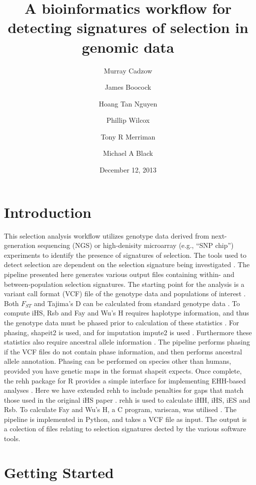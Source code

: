 \documentclass[a4paper,10pt]{article}
\title{\textbf{A bioinformatics workflow for detecting signatures of selection in genomic data}}
\date{December 12, 2013}
\author[1]{Murray Cadzow}
\author[1]{James Boocock}
\author[1,2]{Hoang Tan Nguyen}
\author[1,3]{Phillip Wilcox}
\author[1]{Tony R Merriman}
\author[1]{Michael A Black}
\affil[1]{Department of Biochemistry, University of Otago}
\affil[2]{Department of Mathematics and Statistics, University of Otago}
\affil[3]{Scion Research, Rotorua, New Zealand}
\begin{document}
\maketitle{}\textmd{}
\tableofcontents

\pagebreak
\section{Introduction}

This selection analysis workflow utilizes genotype data derived from
next-generation sequencing (NGS) or high-denisity microarray (e.g.,
``SNP chip'') experiments to identify the presence of signatures of
selection. The tools used to detect selection are dependent on the
selection signature being investigated \citep{Sabeti:2006ha}. The
pipeline presented here generates various output files containing
within- and between-population selection signatures. The starting
point for the analysis
is a variant call format (VCF) file of the genotype data and
populations of interest \citep{Danecek:2011gz}. Both $F_{ST}$ and
Tajima's D can be calculated from standard genotype data
\citep{Weir:1984vn, Tajima:1989un}. To compute iHS, Rsb and Fay
and Wu's H requires haplotype information, and thus the genotype data must be
phased prior to calculation of these statistics \citep{Voight:2006go,
  Gautier:2012et,fayandwush}. For phasing, shapeit2 is
used, and for imputation impute2 is used \citep{impute22009,
  Delaneau:2013hi}. Furthermore these statistics also require
ancestral allele information \citep{Flicek:2012vg}.  The pipeline
performs phasing if the VCF files do not contain phase information, and
then performs ancestral allele annotation. Phasing can be performed on species other than humans, provided you have genetic maps in the format shapeit expects. 
Once complete, the rehh
package for R provides a simple interface for implementing EHH-based
analyses \citep{Gautier:2012et}. Here we have extended rehh to include penalties
for gaps that match those used in the original iHS paper
\citep{Voight:2006go}. rehh is used to calculate iHH, iHS, iES and Rsb. To
calculate Fay and Wu's H, a C program, variscan, was utilised
\citep{variscan2005}. The pipeline is implemented in Python, and takes a VCF
file as input. The output is a colection of files relating to selection
signatures dected by the various software tools.

\section{Getting Started}
\end{document}
